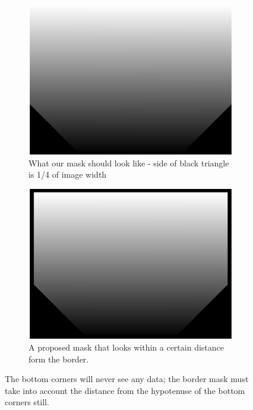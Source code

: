 \documentclass[10pt]{scrartcl}
\begin{document}
\begin{figure}[!ht]
    \centering
    \hspace{-1.0in}
    \begin{subfigure}[b]{.45\linewidth}
        \centering
        \includegraphics[width=1.3\textwidth]{../plots_tables_images/cutcorner.eps}
        \caption{What our mask should look like - side of black triangle is 1/4 of image width}
        \label{noborder}
    \end{subfigure}
    \hspace{.5in}
    \begin{subfigure}[b]{.45\linewidth}
        \centering
        \includegraphics[width=1.3\textwidth]{../plots_tables_images/cutcornerwborder.eps}
        \caption{A proposed mask that looks within a certain distance form the border.}
        \label{aborder}
    \end{subfigure}
    \caption{The bottom corners will never see any data; the border mask must take into account the distance from the hypotenuse of the bottom corners still.}
    \label{cuttingcorners}
\end{figure}
\end{document}
